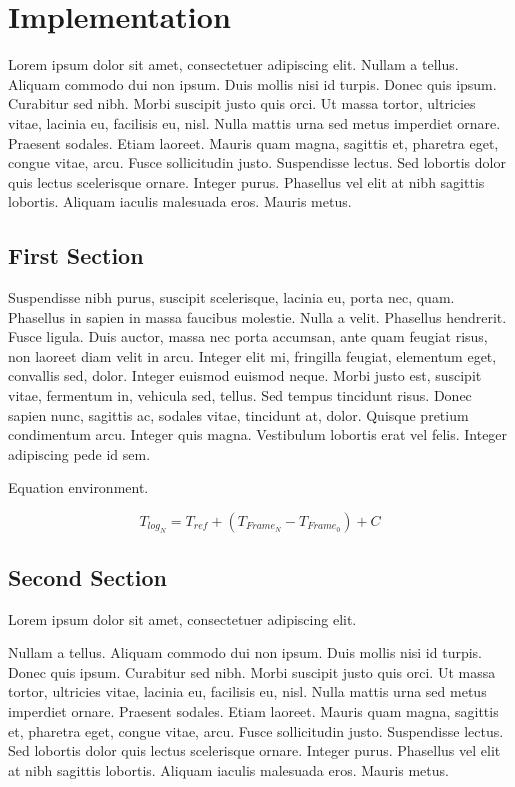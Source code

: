 \chapter{Implementation}
\label{c:chapter2} Lorem ipsum dolor sit amet, consectetuer adipiscing elit.
Nullam a tellus. Aliquam commodo dui non ipsum. Duis mollis nisi id turpis.
Donec quis ipsum. Curabitur sed nibh. Morbi suscipit justo quis orci. Ut massa
tortor, ultricies vitae, lacinia eu, facilisis eu, nisl. Nulla mattis urna sed
metus imperdiet ornare. Praesent sodales. Etiam laoreet. Mauris quam magna,
sagittis et, pharetra eget, congue vitae, arcu. Fusce sollicitudin justo.
Suspendisse lectus. Sed lobortis dolor quis lectus scelerisque ornare. Integer
purus. Phasellus vel elit at nibh sagittis lobortis. Aliquam iaculis malesuada
eros. Mauris metus.

\section{First Section}
\label{st:problemstatement} Suspendisse nibh purus, suscipit scelerisque,
lacinia eu, porta nec, quam. Phasellus in sapien in massa faucibus molestie.
Nulla a velit. Phasellus hendrerit. Fusce ligula. Duis auctor, massa nec porta
accumsan, ante quam feugiat risus, non laoreet diam velit in arcu. Integer elit
mi, fringilla feugiat, elementum eget, convallis sed, dolor. Integer euismod
euismod neque. Morbi justo est, suscipit vitae, fermentum in, vehicula sed,
tellus. Sed tempus tincidunt risus. Donec sapien nunc, sagittis ac, sodales
vitae, tincidunt at, dolor. Quisque pretium condimentum arcu. Integer quis
magna. Vestibulum lobortis erat vel felis. Integer adipiscing pede id sem.

Equation environment.

\begin{equation}
\mbox{$T_{log_{N}}$} =
\mbox{$T_{ref}$} + (\mbox{$T_{Frame_{N}}$} - \mbox{$T_{Frame_{0}}$})
+ \mbox{$C$}
\label{eq:log}
\end{equation}

\section{Second Section}
\label{st:discussion} 
Lorem ipsum dolor sit amet, consectetuer adipiscing elit.

Nullam a tellus. Aliquam commodo dui non ipsum. Duis mollis nisi id turpis.
Donec quis ipsum. Curabitur sed nibh. Morbi suscipit justo quis orci. Ut massa
tortor, ultricies vitae, lacinia eu, facilisis eu, nisl. Nulla mattis urna sed
metus imperdiet ornare. Praesent sodales. Etiam laoreet. Mauris quam magna,
sagittis et, pharetra eget, congue vitae, arcu. Fusce sollicitudin justo.
Suspendisse lectus. Sed lobortis dolor quis lectus scelerisque ornare. Integer
purus. Phasellus vel elit at nibh sagittis lobortis. Aliquam iaculis malesuada
eros. Mauris metus.

